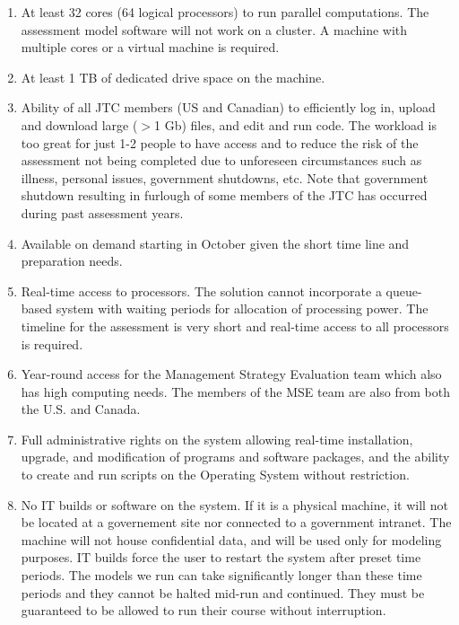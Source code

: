 \documentclass[12pt]{book}\usepackage[]{graphicx}\usepackage[]{color}
\begin{document}
\begin{enumerate}

  \item At least 32 cores (64 logical processors) to run parallel computations.
    The assessment model software will not work on a cluster. A machine with
    multiple cores or a virtual machine is required.

 \item At least 1 TB of dedicated drive space on the machine.

  \item Ability of all JTC members (US and Canadian) to efficiently log in,
    upload and download large ($>$1 Gb) files, and edit and run code.
    The workload is too great for just 1-2 people to have access
    and to reduce the risk of the
    assessment not being completed due to unforeseen circumstances
    such as illness, personal issues, government shutdowns, etc. Note that
    government shutdown resulting in furlough of some members of the JTC has
    occurred during past assessment years.

  \item Available on demand starting in October given
    the short time line and preparation needs.

  \item Real-time access to processors. The solution cannot incorporate a
    queue-based system with waiting periods for allocation of processing power.
    The timeline for the assessment is very short and real-time access to all
    processors is required.

  \item Year-round access for the Management Strategy Evaluation team which also
    has high computing needs. The members of the MSE team are also from both
    the U.S. and Canada.

  \item Full administrative rights on the system allowing real-time installation,
    upgrade, and modification of programs and software packages, and the ability to
    create and run scripts on the Operating System without restriction.

  \item No IT builds or software on the system. If it is a physical machine, it
    will not be located at a governement site nor connected to a government intranet.
    The machine will not house confidential data, and will be used only for modeling
    purposes. IT builds force the user to restart the system after preset time
    periods. The models we run can take significantly longer than these time periods
    and they cannot be halted mid-run and continued. They must be guaranteed to be
    allowed to run their course without interruption.

\end{enumerate}
\end{document}

